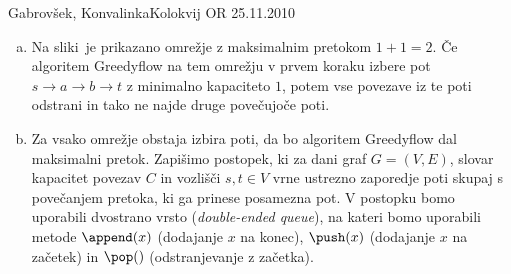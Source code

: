 \begin{naloga}{Gabrovšek, Konvalinka}{Kolokvij OR 25.11.2010}
\begin{odgovor}
\begin{enumerate}[(a)]
\item Na sliki~
je prikazano omrežje z maksimalnim pretokom $1+1 = 2$.
Če algoritem {\sc Greedyflow} na tem omrežju
v prvem koraku izbere pot $s \to a \to b \to t$ z minimalno kapaciteto $1$,
potem vse povezave iz te poti odstrani in tako ne najde druge povečujoče poti.

\item Za vsako omrežje obstaja izbira poti,
da bo algoritem {\sc Greedyflow} dal maksimalni pretok.
Zapišimo postopek, ki za dani graf $G = (V, E)$,
slovar kapacitet povezav $C$ in vozlišči $s, t \in V$
vrne ustrezno zaporedje poti skupaj s povečanjem pretoka,
ki ga prinese posamezna pot.
V postopku bomo uporabili dvostrano vrsto ({\em double-ended queue}),
na kateri bomo uporabili metode $\append(x)$ (dodajanje $x$ na konec),
$\push(x)$ (dodajanje $x$ na začetek) in $\pop()$ (odstranjevanje z začetka).


\end{enumerate}
\end{odgovor}
\end{naloga}
